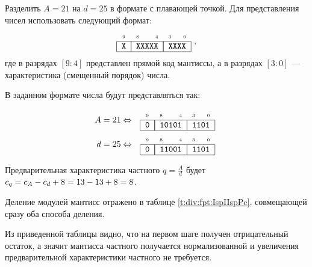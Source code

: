 \begin{Example}
    Разделить $A=21$ на $d=25$ в формате с плавающей точкой. Для представления чисел использовать следующий формат:
    \[\FloatMyCharX{X}{XXXXX}{XXXX},\]
    где в разрядах $[9:4]$ представлен прямой код мантиссы, а в разрядах $[3:0]$ --- характеристика (смещенный порядок) числа.
\end{Example}
\begin{Solve}
    В заданном формате числа будут представляться так:
    
    \begin{align*}
        A=21 & \Leftrightarrow & \FloatMyCharX{0}{10101}{1101}\\
        d=25 & \Leftrightarrow & \FloatMyCharX{0}{11001}{1101}
    \end{align*}
    
    Предварительная характеристика частного $q=\frac{A}{d}$ будет $c_{q}=c_{A}-c_{d}+8=13-13+8=8$.
    
    Деление модулей мантисс отражено в таблице \ref{t:div:fpt:IspIIspPc}, совмещающей сразу оба способа деления.
    
    Из приведенной таблицы видно, что на первом шаге получен отрицательный остаток, а значит мантисса частного получается нормализованной и увеличения предварительной характеристики частного не требуется.
    

\end{Solve}
